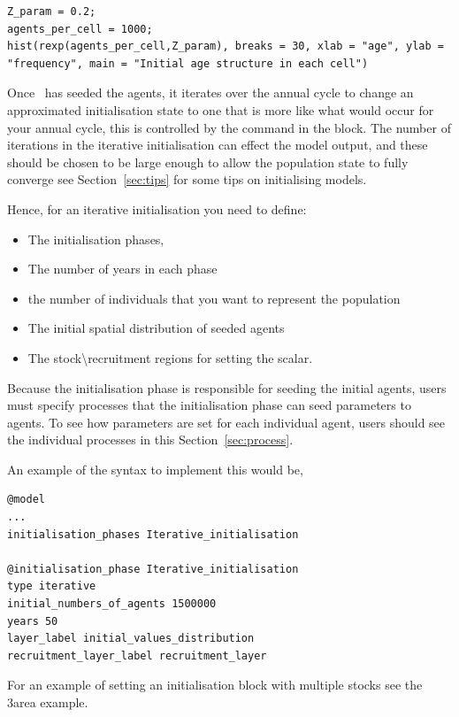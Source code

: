 \begin{lstlisting}
Z_param = 0.2;
agents_per_cell = 1000;
hist(rexp(agents_per_cell,Z_param), breaks = 30, xlab = "age", ylab = "frequency", main = "Initial age structure in each cell")
\end{lstlisting}

Once \IBM\ has seeded the agents, it iterates over the annual cycle to change an approximated initialisation state to one that is more like what would occur for your annual cycle, this is controlled by the  command in the  block. The number of iterations in the iterative initialisation can effect the model output, and these should be chosen to be large enough to allow the population state to fully converge see Section~\ref{sec:tips} for some tips on initialising models.

Hence, for an iterative initialisation you need to define:
\begin{itemize}
  \item The initialisation phases,
  \item The number of years in each phase
  \item the number of individuals that you want to represent the population
  \item The initial spatial distribution of seeded agents
  \item The stock\textbackslash recruitment regions for setting the scalar.
\end{itemize}

Because the initialisation phase is responsible for seeding the initial agents, users must specify processes that the initialisation phase can seed parameters to agents. To see how parameters are set for each individual agent, users should see the individual processes in this Section~\ref{sec:process}.

An example of the syntax to implement this would be,
{\small{\begin{verbatim}
@model
...
initialisation_phases Iterative_initialisation

@initialisation_phase Iterative_initialisation
type iterative
initial_numbers_of_agents 1500000
years 50
layer_label initial_values_distribution
recruitment_layer_label recruitment_layer
\end{verbatim}}}

For an example of setting an initialisation block with multiple stocks see the 3area example.




